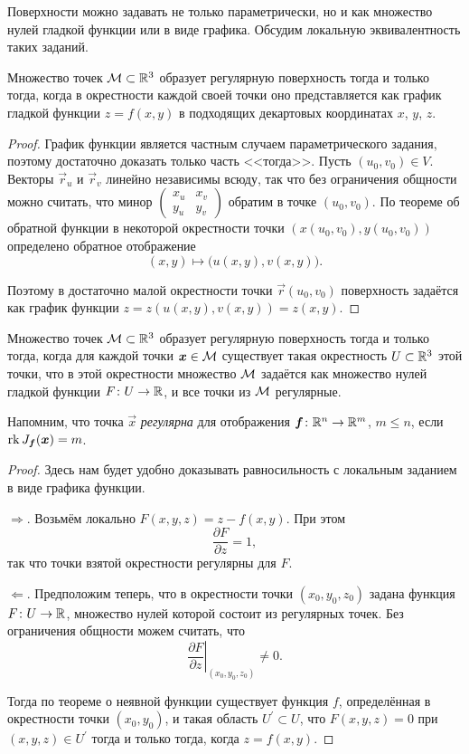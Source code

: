 Поверхности можно задавать не только параметрически, но и как множество нулей гладкой функции или в виде графика. Обсудим локальную эквивалентность таких заданий.

\begin{proposition} \label{proposition:SurfaceGraph}
	Множество точек $\mathcal{M} \subset \mathbb{R}^3$ образует регулярную поверхность тогда и только тогда, когда в окрестности каждой своей точки оно представляется как график гладкой функции $z = f(x, y)$ в подходящих декартовых координатах $x$, $y$, $z$.
\end{proposition}

\begin{proof}
	График функции является частным случаем параметрического задания, поэтому достаточно доказать только часть <<тогда>>. Пусть $(u_0, v_0) \in V$. Векторы $\vec{r}_u$ и $\vec{r}_v$ линейно независимы всюду, так что без ограничения общности можно считать, что минор
	$
		\begin{pmatrix}
			x_u & x_v\\
			y_u & y_v
		\end{pmatrix}
	$
	обратим в точке $(u_0, v_0)$. По теореме об обратной функции в некоторой окрестности точки $(x(u_0, v_0), y(u_0, v_0))$ определено обратное отображение
	\[
		(x, y) \mapsto \big(u(x, y), v(x, y)\big).
	\]

	Поэтому в достаточно малой окрестности точки $\vec{r}(u_0, v_0)$ поверхность задаётся как график функции $z = z(u(x, y), v(x, y)) = z(x, y)$.
\end{proof}

\begin{proposition}
	Множество точек $\mathcal{M} \subset \mathbb{R}^3$ образует регулярную поверхность тогда и только тогда, когда для каждой точки $\boldsymbol{x} \in \mathcal{M}$ существует такая окрестность $U \subset \mathbb{R}^3$ этой точки, что в этой окрестности множество $\mathcal{M}$ задаётся как множество нулей гладкой функции $F\colon U \to \mathbb{R}$, и все точки из $\mathcal{M}$ регулярные.
\end{proposition}

\noindent
Напомним, что точка $\vec{x}$ \textit{регулярна} для отображения $\boldsymbol{f}\colon \mathbb{R}^n \to \mathbb{R}^m$, $m \leqslant n$, если $\operatorname{rk} J_{\boldsymbol{f}}(\boldsymbol{x}) = m$.

\begin{proof}
	Здесь нам будет удобно доказывать равносильность с локальным заданием в виде графика функции.

	$\Rightarrow$. Возьмём локально $F(x, y, z) = z - f(x, y)$. При этом
	\[
		\frac{\partial F}{\partial z} = 1,
	\]
	так что точки взятой окрестности регулярны для $F$.

	$\Leftarrow$. Предположим теперь, что в окрестности точки $(x_0, y_0, z_0)$ задана функция $F\colon U \to \mathbb{R}$, множество нулей которой состоит из регулярных точек. Без ограничения общности можем считать, что
	\[
		\left.\frac{\partial F}{\partial z}\right|_{(x_0, y_0, z_0)} \ne 0.
	\]

	Тогда по теореме о неявной функции существует функция $f$, определённая в окрестности точки $(x_0, y_0)$, и такая область $U^\prime \subset U$, что $F(x, y, z) = 0$ при $(x, y, z) \in U^\prime$ тогда и только тогда, когда $z = f(x, y)$.
\end{proof}

